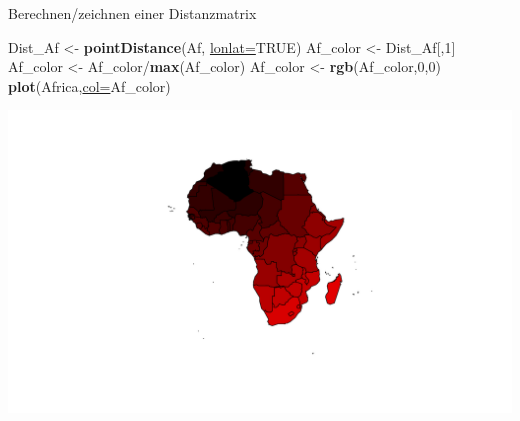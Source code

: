 \documentclass[ignorenonframetext,]{beamer}
\newenvironment{Shaded}{\begin{snugshade}}{\end{snugshade}}
\newcommand{\DataTypeTok}[1]{\textcolor[rgb]{0.74,0.68,0.62}{\underline{#1}}}
\newcommand{\DecValTok}[1]{\textcolor[rgb]{0.27,0.67,0.26}{#1}}
\newcommand{\KeywordTok}[1]{\textcolor[rgb]{0.26,0.66,0.93}{\textbf{#1}}}
\newcommand{\NormalTok}[1]{\textcolor[rgb]{0.74,0.68,0.62}{#1}}
\newcommand{\OperatorTok}[1]{\textcolor[rgb]{0.74,0.68,0.62}{#1}}
\newcommand{\OtherTok}[1]{\textcolor[rgb]{0.74,0.68,0.62}{#1}}
\newcommand{\StringTok}[1]{\textcolor[rgb]{0.02,0.61,0.04}{#1}}
\begin{document}
\begin{frame}[fragile]{Berechnen/zeichnen einer Distanzmatrix}
\protect\hypertarget{berechnenzeichnen-einer-distanzmatrix}{}

\begin{Shaded}
\begin{Highlighting}[]
\NormalTok{Dist_Af <-}\StringTok{ }\KeywordTok{pointDistance}\NormalTok{(Af, }\DataTypeTok{lonlat=}\OtherTok{TRUE}\NormalTok{)}
\NormalTok{Af_color <-}\StringTok{ }\NormalTok{Dist_Af[,}\DecValTok{1}\NormalTok{]}
\NormalTok{Af_color <-}\StringTok{ }\NormalTok{Af_color}\OperatorTok{/}\KeywordTok{max}\NormalTok{(Af_color)}
\NormalTok{Af_color <-}\StringTok{ }\KeywordTok{rgb}\NormalTok{(Af_color,}\DecValTok{0}\NormalTok{,}\DecValTok{0}\NormalTok{)}
\KeywordTok{plot}\NormalTok{(Africa,}\DataTypeTok{col=}\NormalTok{Af_color)}
\end{Highlighting}
\end{Shaded}

\includegraphics{A7_spdep_files/figure-beamer/Africa Distance-1.pdf}

\end{frame}
\end{document}
